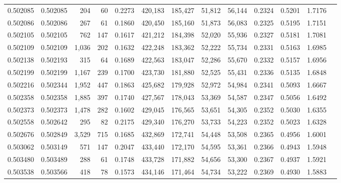 \begin{tabular}{rrrrrrrrrrrrr}
0.502085 & 0.502085 &   204 &    60 &                                     0.2273 & 420,183 & 185,427 &  51,812 &  56,144 & 0.2324 & 0.5201 & 1.7176 \\
0.502086 & 0.502086 &   267 &    61 &                                     0.1860 & 420,450 & 185,160 &  51,873 &  56,083 & 0.2325 & 0.5195 & 1.7151 \\
0.502105 & 0.502105 &   762 &   147 &                                     0.1617 & 421,212 & 184,398 &  52,020 &  55,936 & 0.2327 & 0.5181 & 1.7081 \\
0.502109 & 0.502109 & 1,036 &   202 &                                     0.1632 & 422,248 & 183,362 &  52,222 &  55,734 & 0.2331 & 0.5163 & 1.6985 \\
0.502138 & 0.502193 &   315 &    64 &                                     0.1689 & 422,563 & 183,047 &  52,286 &  55,670 & 0.2332 & 0.5157 & 1.6956 \\
0.502199 & 0.502199 & 1,167 &   239 &                                     0.1700 & 423,730 & 181,880 &  52,525 &  55,431 & 0.2336 & 0.5135 & 1.6848 \\
0.502216 & 0.502344 & 1,952 &   447 &                                     0.1863 & 425,682 & 179,928 &  52,972 &  54,984 & 0.2341 & 0.5093 & 1.6667 \\
0.502358 & 0.502358 & 1,885 &   397 &                                     0.1740 & 427,567 & 178,043 &  53,369 &  54,587 & 0.2347 & 0.5056 & 1.6492 \\
0.502373 & 0.502373 & 1,478 &   282 &                                     0.1602 & 429,045 & 176,565 &  53,651 &  54,305 & 0.2352 & 0.5030 & 1.6355 \\
0.502558 & 0.502642 &   295 &    82 &                                     0.2175 & 429,340 & 176,270 &  53,733 &  54,223 & 0.2352 & 0.5023 & 1.6328 \\
0.502676 & 0.502849 & 3,529 &   715 &                                     0.1685 & 432,869 & 172,741 &  54,448 &  53,508 & 0.2365 & 0.4956 & 1.6001 \\
0.503062 & 0.503149 &   571 &   147 &                                     0.2047 & 433,440 & 172,170 &  54,595 &  53,361 & 0.2366 & 0.4943 & 1.5948 \\
0.503480 & 0.503489 &   288 &    61 &                                     0.1748 & 433,728 & 171,882 &  54,656 &  53,300 & 0.2367 & 0.4937 & 1.5921 \\
0.503538 & 0.503566 &   418 &    78 &                                     0.1573 & 434,146 & 171,464 &  54,734 &  53,222 & 0.2369 & 0.4930 & 1.5883 \\

\end{tabular}
